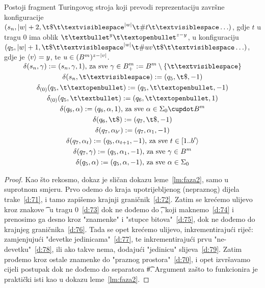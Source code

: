 \begin{lema}[{name=[četvrti fragment transpiliranog stroja]}]\label{lm:faza4}
Postoji fragment Turingovog stroja koji prevodi reprezentaciju završne konfiguracije $(s_n,\dulj w+2,\t\$\bl^{\dulj w}\t\#t\bl\ldots)$, gdje $t$ u tragu $0$ ima oblik $\t\textbullet^y\t\textopenbullet^{z-y}$, u konfiguraciju $(q_5,\dulj w+1,\t\$\bl^{\dulj w}\t\#uv\t\$\bl\ldots)$, gdje je $\langle v\rangle=y$, te $u\in(B^m)^{z-\lvert v\rvert}$.
\end{lema}
\noindent\begin{gather}
\SwapAboveDisplaySkip
\label{d:71}\delta(s_n,\gamma):=(s_n,\gamma,1)\text{, za sve } \gamma\in B^m_+:=B^m\setminus\{\bl\}\\
\label{d:72}\delta(s_n,\bl):=(q_5,\t\$,-1)\\
\label{d:73}\delta_{(0)}(q_5,\t\textopenbullet):=(q_5,\t\textopenbullet,-1)\\
\label{d:74}\delta_{(0)}(q_5,\t\textbullet):=(q_6,\t\textopenbullet,1)\\
\label{d:75}\delta(q_6,\alpha):=(q_6,\alpha,1)\text{, za sve }\alpha\in\Sigma_0\dcup B^m\\
\label{d:76}\delta(q_6,\t\$):=(q_7,\t\$,-1)\\
\label{d:77}\delta(q_7,\alpha_{b'}):=(q_7,\alpha_1,-1)\\
\label{d:78}\delta(q_7,\alpha_t):=(q_5,\alpha_{t+1},-1)\text{, za sve }t\in[1..b'\rangle\\
\label{d:79}\delta(q_7,\gamma):=(q_5,\alpha_1,-1)\text{, za sve }\gamma\in B^m\\
\label{d:70}\delta(q_5,\alpha):=(q_5,\alpha,-1)\text{, za sve }\alpha\in\Sigma_0
\end{gather}

\begin{proof}
Kao što rekosmo, dokaz je sličan dokazu leme~\ref{lm:faza2}, samo u suprotnom smjeru. Prvo odemo do kraja upotrijebljenog (nepraznog) dijela trake~\eqref{d:71}, i tamo zapišemo krajnji graničnik~\eqref{d:72}. Zatim se krećemo ulijevo kroz znakove \t\textopenbullet\ u tragu $0$~\eqref{d:73} dok ne dođemo do \t\textbullet, koji maknemo~\eqref{d:74} i prenosimo ga desno kroz "znamenke" i "stupce bitova"~\eqref{d:75}, dok ne dođemo do krajnjeg graničnika~\eqref{d:76}. Tada se opet krećemo ulijevo, inkrementirajući riječ: zamjenjujući "devetke jedinicama"~\eqref{d:77}, te inkrementirajući prvu "ne-devetku"~\eqref{d:78}, ili ako takve nema, dodajući "jedinicu" slijeva~\eqref{d:79}. Zatim prođemo kroz ostale znamenke do "praznog prostora"~\eqref{d:70}, i opet izvršavamo cijeli postupak dok ne dođemo do separatora \t\#.
Argument zašto to funkcionira je praktički isti kao u dokazu leme~\ref{lm:faza2}. %
\end{proof}

